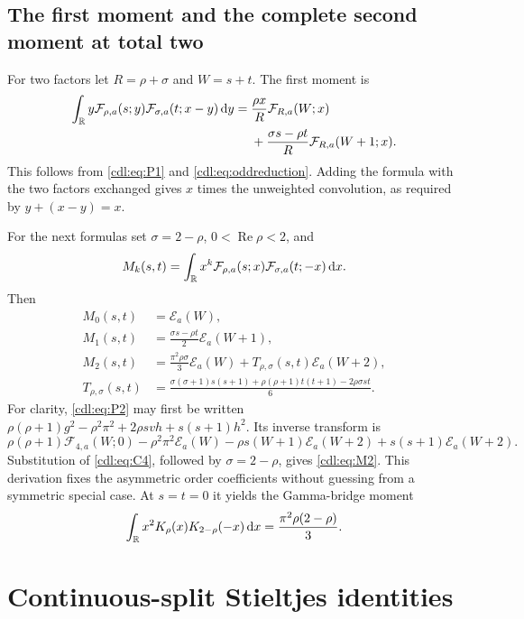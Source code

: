 \documentclass[11pt,letterpaper]{article}
\numberwithin{equation}{section}
\theoremstyle{definition}\newtheorem{definition}[theorem]{Definition}
\theoremstyle{remark}\newtheorem{remark}[theorem]{Remark}
\newcommand{\Rea}{\operatorname{Re}}\newcommand{\Ima}{\operatorname{Im}}
\newcommand{\F}{\mathcal F}\newcommand{\E}{\mathcal E}
\begin{document}
\subsection{The first moment and the complete second moment at total two}
For two factors let $R=\rho+\sigma$ and $W=s+t$. The first moment is
\begin{equation}\label{cdl:eq:firstgeneral}
 \begin{split}
 \int_\R y\F_{\rho,a}(s;y)\F_{\sigma,a}(t;x-y)\dd y
 ={}&\frac{\rho x}{R}\F_{R,a}(W;x)\\
 &+\frac{\sigma s-\rho t}{R}\F_{R,a}(W+1;x).
 \end{split}
\end{equation}
This follows from \eqref{cdl:eq:P1} and \eqref{cdl:eq:oddreduction}.
Adding the formula with the two factors exchanged gives $x$ times the
unweighted convolution, as required by $y+(x-y)=x$.

For the next formulas set $\sigma=2-\rho$, $0<\Rea\rho<2$, and
\begin{equation}\label{cdl:eq:Mdef}
 M_k(s,t)=\int_\R x^k\F_{\rho,a}(s;x)
                     \F_{\sigma,a}(t;-x)\dd x.
\end{equation}
Then
\begin{align}
 M_0(s,t)&=\E_a(W),\label{cdl:eq:M0}\\
 M_1(s,t)&=\frac{\sigma s-\rho t}{2}\E_a(W+1),\label{cdl:eq:M1}\\
 M_2(s,t)&=\frac{\pi^2\rho\sigma}{3}\E_a(W)
                  +T_{\rho,\sigma}(s,t)\E_a(W+2),\label{cdl:eq:M2}\\
 T_{\rho,\sigma}(s,t)&=
 \frac{\sigma(\sigma+1)s(s+1)+\rho(\rho+1)t(t+1)-2\rho\sigma st}{6}.
 \label{cdl:eq:T}
\end{align}
For clarity, \eqref{cdl:eq:P2} may first be written
$\rho(\rho+1)g^2-\rho^2\pi^2+2\rho s vh+s(s+1)h^2$.
Its inverse transform is
\[
 \rho(\rho+1)\F_{4,a}(W;0)-\rho^2\pi^2\E_a(W)
 -\rho s(W+1)\E_a(W+2)+s(s+1)\E_a(W+2).
\]
Substitution of \eqref{cdl:eq:C4}, followed by $\sigma=2-\rho$,
gives \eqref{cdl:eq:M2}. This derivation fixes the asymmetric order
coefficients without guessing from a symmetric special case.
At $s=t=0$ it yields the Gamma-bridge moment
\begin{equation}\label{cdl:eq:variance}
 \int_\mathbb R x^2K_\rho(x)K_{2-\rho}(-x)\,\mathrm d x
 =\frac{\pi^2\rho(2-\rho)}3.
\end{equation}

\section{Continuous-split Stieltjes identities}
\label{cdl:sec:stieltjes}
\end{document}
